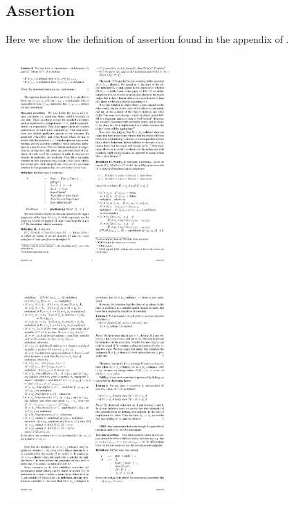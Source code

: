 \documentclass[a4paper,11pt,twoside]{article}
\begin{document}
{\subsection{Assertion}\label{app:assertion}
Here we show the definition of assertion found in the appendix of \cite{drossopoulou2015b}.\\

\includegraphics[width=0.5\textwidth,valign=t]{figures/app_assertion1.pdf}
\includegraphics[width=0.5\textwidth,valign=t]{figures/app_assertion2.pdf}

}
\end{document}
